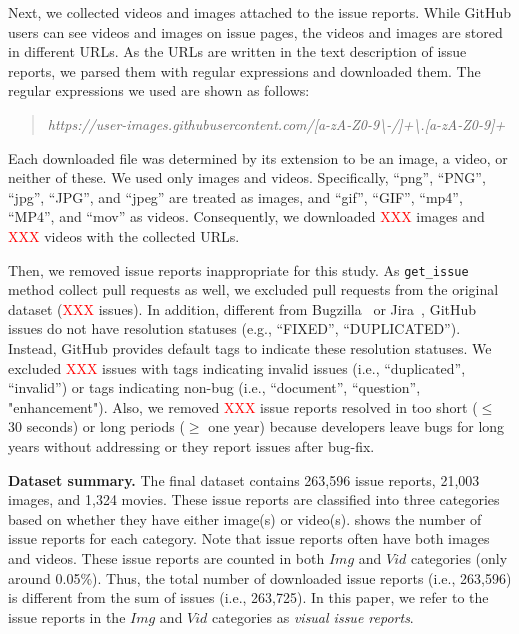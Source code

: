 Next, we collected videos and images attached to the issue reports. While GitHub users can see videos and images on issue pages, the videos and images are stored in different URLs. As the URLs are written in the text description of issue reports, we parsed them with regular expressions and downloaded them. The regular expressions we used are shown as follows:
\begin{quote}
\addtolength\leftmargini{0in}
{\it https://user-images.githubusercontent.com/[a-zA-Z0-9\textbackslash-/]+\textbackslash.[a-zA-Z0-9]+}
\end{quote}
Each downloaded file was determined by its extension to be an image, a video, or neither of these. We used only images and videos. Specifically, ``png'', ``PNG'', ``jpg'', ``JPG'', and ``jpeg'' are treated as images, and  ``gif'', ``GIF'', ``mp4'', ``MP4'', and ``mov'' as videos. 
Consequently, we downloaded \textcolor{red}{XXX} images and \textcolor{red}{XXX} videos with the collected URLs. 

Then, we removed issue reports inappropriate for this study. As \texttt{get\_issue} method collect pull requests as well, we excluded pull requests from the original dataset (\textcolor{red}{XXX} issues).  
In addition, different from Bugzilla~\citep{Bugzilla} or Jira~\citep{JIRA}, GitHub issues do not have resolution statuses (e.g., ``FIXED'', ``DUPLICATED''). 
Instead,  GitHub provides default tags to indicate these resolution statuses. 
We excluded \textcolor{red}{XXX} issues with tags indicating invalid issues (i.e., ``duplicated'', ``invalid'') or tags indicating non-bug (i.e., ``document'', ``question'', "enhancement"). Also, we removed \textcolor{red}{XXX} issue reports resolved in too short ($\leq$ 30 seconds) or long periods  ($\geq$ one year) because developers leave bugs for long years without addressing or they report issues after bug-fix. 


{\bf Dataset summary.} The final dataset contains 263,596 issue reports,  21,003 images, and 1,324 movies. 
These issue reports are classified into three categories based on whether they have either image(s) or video(s). 
 shows the number of issue reports for each category. 
Note that issue reports often have both images and videos. 
These issue reports are counted in both $Img$ and $Vid$ categories (only around 0.05\%). 
Thus, the total number of downloaded issue reports (i.e., 263,596) is different from the sum of issues (i.e., 263,725). 
In this paper, we refer to the issue reports in the $Img$ and $Vid$ categories
as \textit{visual issue reports}. 

